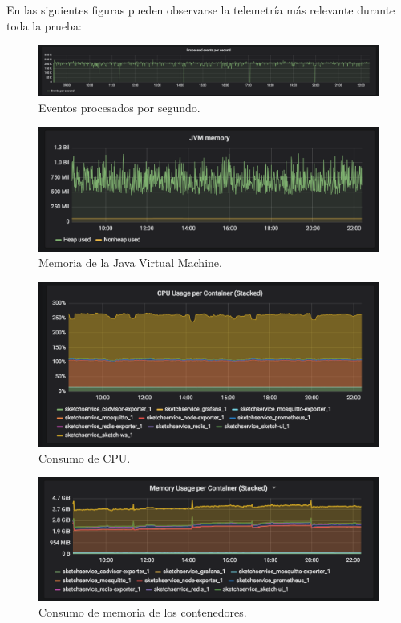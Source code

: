 \documentclass[a4paper,10pt, oneside]{article}
\begin{document}
En las siguientes figuras pueden observarse la telemetría más relevante durante toda la prueba:
\begin{figure}[h]
	\centering
	\includegraphics[width=1\textwidth]{./graph/processed_evts_per_second.png}
	\caption{Eventos procesados por segundo.}
	\label{diag:processed_evts_per_second}
\end{figure}
\begin{figure}[h]
	\centering
	\includegraphics[width=1\textwidth]{./graph/jvm_memory.png}
	\caption{Memoria de la Java Virtual Machine.}
	\label{diag:jvm_memory}
\end{figure}
\begin{figure}[h]
	\centering
	\includegraphics[width=1\textwidth]{./graph/cpu_usage.png}
	\caption{Consumo de CPU.}
	\label{diag:cpu_usage}
\end{figure}
\begin{figure}[h]
	\centering
	\includegraphics[width=1\textwidth]{./graph/memory_usage.png}
	\caption{Consumo de memoria de los contenedores.}
	\label{diag:memory_usage}
\end{figure}
\clearpage
\end{document}
